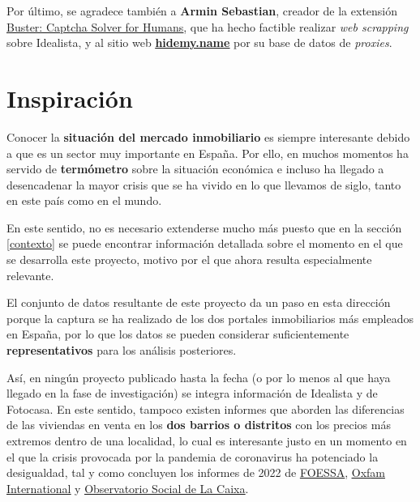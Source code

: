 \documentclass[12pt]{article}
\begin{document}
Por último, se agradece también a \textbf{Armin Sebastian}, creador de la extensión \href{https://chrome.google.com/webstore/detail/buster-captcha-solver-for/mpbjkejclgfgadiemmefgebjfooflfhl}{\underline{Buster: Captcha Solver for Humans}}, que ha hecho factible realizar \textit{web scrapping} sobre Idealista, y al sitio web \href{https://hidemy.name/proxy-list/}{\underline{\textbf{hidemy.name}}} por su base de datos de \textit{proxies}.

\vspace{-1.5em}\section{Inspiración}\vspace{-1em}

Conocer la \textbf{situación del mercado inmobiliario} es siempre interesante debido a que es un sector muy importante en España. Por ello, en muchos momentos ha servido de \textbf{termómetro} sobre la situación económica e incluso ha llegado a desencadenar la mayor crisis que se ha vivido en lo que llevamos de siglo, tanto en este país como en el mundo. 

En este sentido, no es necesario extenderse mucho más puesto que en la sección \ref{contexto} se puede encontrar información detallada sobre el momento en el que se desarrolla este proyecto, motivo por el que ahora resulta especialmente relevante.

El conjunto de datos resultante de este proyecto da un paso en esta dirección porque la captura se ha realizado de los dos portales inmobiliarios más empleados en España, por lo que los datos se pueden considerar suficientemente \textbf{representativos} para los análisis posteriores. 

Así, en ningún proyecto publicado hasta la fecha (o por lo menos al que haya llegado en la fase de investigación) se integra información de Idealista y de Fotocasa. En este sentido, tampoco existen informes que aborden las diferencias de las viviendas en venta en los \textbf{dos barrios o distritos} con los precios más extremos dentro de una localidad, lo cual es interesante justo en un momento en el que la crisis provocada por la pandemia de coronavirus ha potenciado la desigualdad, tal y como concluyen los informes de 2022 de \href{https://www.foessa.es/blog/foessa-presenta-la-primera-radiografia-social-completa-de-la-crisis-de-la-covid-19-en-toda-espana/}{\underline{FOESSA}}, \href{https://oxfamilibrary.openrepository.com/bitstream/handle/10546/621341/bp-inequality-kills-170122-es.pdf}{\underline{Oxfam International}} y \href{https://elobservatoriosocial.fundacionlacaixa.org/documents/22890/492074/T01_ID_ES_AyalaCant%C3%B3.pdf/a0746431-109f-e009-6c77-296c378f0438?t=1642072938395}{\underline{Observatorio Social de La Caixa}}.
\end{document}
